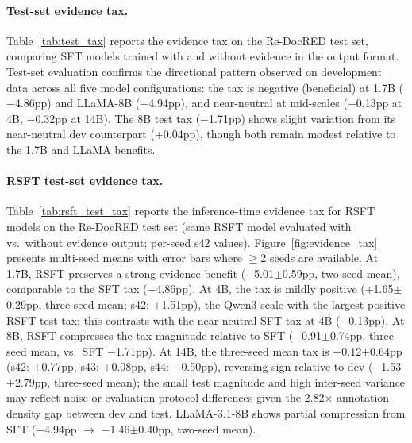 \paragraph{Test-set evidence tax.}
Table~\ref{tab:test_tax} reports the evidence tax on the Re-DocRED test set, comparing SFT models trained with and without evidence in the output format. Test-set evaluation confirms the directional pattern observed on development data across all five model configurations: the tax is negative (beneficial) at 1.7B ($-$4.86pp) and LLaMA-8B ($-$4.94pp), and near-neutral at mid-scales ($-$0.13pp at 4B, $-$0.32pp at 14B). The 8B test tax ($-$1.71pp) shows slight variation from its near-neutral dev counterpart (+0.04pp), though both remain modest relative to the 1.7B and LLaMA benefits.

\begin{table}[t]
\centering
\caption{Evidence tax on Re-DocRED test set (Ign-F1 \%). Tax $=$ no-evi $-$ with-evi; negative $=$ benefit. All results use s42. Dev tax from Table~\ref{tab:training_tax}.}
\label{tab:test_tax}
\small
{}
\end{table}

\paragraph{RSFT test-set evidence tax.}
Table~\ref{tab:rsft_test_tax} reports the inference-time evidence tax for RSFT models on the Re-DocRED test set (same RSFT model evaluated with vs.\ without evidence output; per-seed s42 values). Figure~\ref{fig:evidence_tax} presents multi-seed means with error bars where $\geq$2 seeds are available. At 1.7B, RSFT preserves a strong evidence benefit ($-$5.01$\pm$0.59pp, two-seed mean), comparable to the SFT tax ($-$4.86pp). At 4B, the tax is mildly positive (+1.65$\pm$0.29pp, three-seed mean; s42: +1.51pp), the Qwen3 scale with the largest positive RSFT test tax; this contrasts with the near-neutral SFT tax at 4B ($-$0.13pp). At 8B, RSFT compresses the tax magnitude relative to SFT ($-$0.91$\pm$0.74pp, three-seed mean, vs.\ SFT $-$1.71pp). At 14B, the three-seed mean tax is +0.12$\pm$0.64pp (s42: +0.77pp, s43: +0.08pp, s44: $-$0.50pp), reversing sign relative to dev ($-$1.53$\pm$2.79pp, three-seed mean); the small test magnitude and high inter-seed variance may reflect noise or evaluation protocol differences given the 2.82$\times$ annotation density gap between dev and test. LLaMA-3.1-8B shows partial compression from SFT ($-$4.94pp $\to$ $-$1.46$\pm$0.40pp, two-seed mean).

